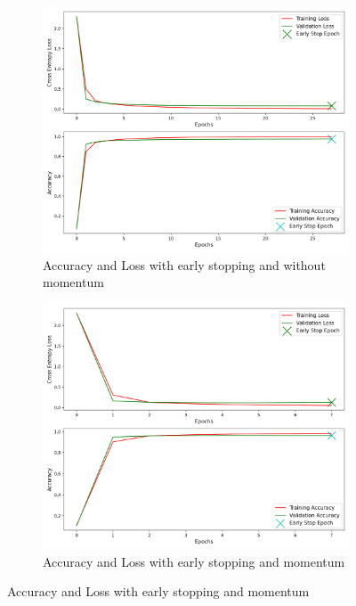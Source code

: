 \begin{figure}[H]
	\begin{subfigure}{0.5\textwidth}
		\centering
		\includegraphics[width=1.0\textwidth]{./images/early_stop_no_momentum.png}
		\caption{Accuracy and Loss with early stopping and without momentum}
		\label{fig:early_stop_no_momentum}
	\end{subfigure}
	\begin{subfigure}{0.5\textwidth}
		\centering
		\includegraphics[width=1.0\textwidth]{./images/momentum_early_stop.png}
		\caption{Accuracy and Loss with early stopping and momentum}
		\label{fig:momentum_early_stop}
	\end{subfigure}
\end{figure}

